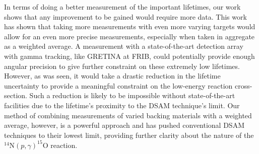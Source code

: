 In terms of doing a better measurement of the important lifetimes, our work shows that any improvement to be gained would require more data. This work has shown that taking more measurements with even more varying targets would allow for an even more precise measurements, especially when taken in aggregate as a weighted average. A measurement with a state-of-the-art detection array with gamma tracking, like GRETINA at FRIB, could potentially provide enough angular precision to give further constraint on these extremely low lifetimes. However, as was seen, it would take a drastic reduction in the lifetime uncertainty to provide a meaningful constraint on the low-energy reaction cross-section. Such a reduction is likely to be impossible without state-of-the-art facilities due to the lifetime's proximity to the DSAM technique's limit. Our method of combining measurements of varied backing materials with a weighted average, however, is a powerful approach and has pushed conventional DSAM techniques to their lowest limit, providing further clarity about the nature of the $^{14}$N$\left( p,\gamma \right) ^{15}$O reaction. 



%
% 
% 
